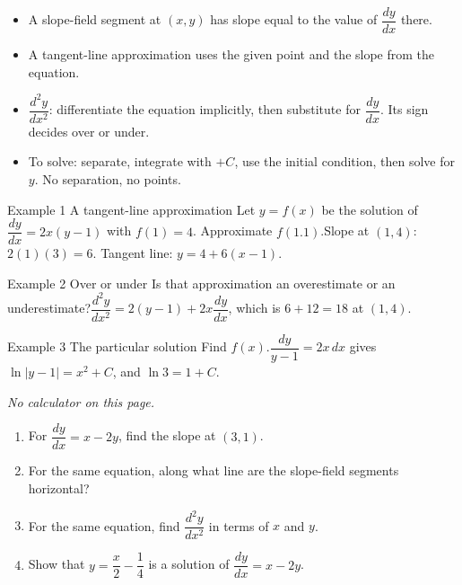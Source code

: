 \documentclass[11pt]{article}
\begin{document}

\begin{ideabox}
\begin{itemize}[leftmargin=*,itemsep=2pt,topsep=2pt]
  \item A slope-field segment at $(x,y)$ has slope equal to the value of $\dfrac{dy}{dx}$ there.
  \item A tangent-line approximation uses the given point and the slope from the equation.
  \item $\dfrac{d^2y}{dx^2}$: differentiate the equation implicitly, then substitute for $\dfrac{dy}{dx}$. Its sign decides over or under.
  \item To solve: separate, integrate with $+C$, use the initial condition, then solve for $y$. No separation, no points.
\end{itemize}
\end{ideabox}

\begin{example}{Example 1 \textperiodcentered{} A tangent-line approximation}
Let $y=f(x)$ be the solution of $\dfrac{dy}{dx}=2x(y-1)$ with $f(1)=4$. Approximate $f(1.1)$.\soln Slope at $(1,4)$: $2(1)(3)=6$. Tangent line: $y=4+6(x-1)$.
\end{example}

\begin{example}{Example 2 \textperiodcentered{} Over or under}
Is that approximation an overestimate or an underestimate?\soln $\dfrac{d^2y}{dx^2}=2(y-1)+2x\dfrac{dy}{dx}$, which is $6+12=18$ at $(1,4)$.
\end{example}

\begin{example}{Example 3 \textperiodcentered{} The particular solution}
Find $f(x)$.\soln $\dfrac{dy}{y-1}=2x\,dx$ gives $\ln|y-1|=x^2+C$, and $\ln3=1+C$.
\end{example}

\newpage
{}
\emph{No calculator on this page.}
\begin{enumerate}[leftmargin=*,itemsep=2pt]
  \item For $\dfrac{dy}{dx}=x-2y$, find the slope at $(3,1)$.\work{2.3cm}
  \item For the same equation, along what line are the slope-field segments horizontal?\work{2.3cm}
  \item For the same equation, find $\dfrac{d^2y}{dx^2}$ in terms of $x$ and $y$.\work{2.3cm}
  \item Show that $y=\dfrac x2-\dfrac14$ is a solution of $\dfrac{dy}{dx}=x-2y$.\work{2.3cm}
\end{enumerate}
\end{document}
